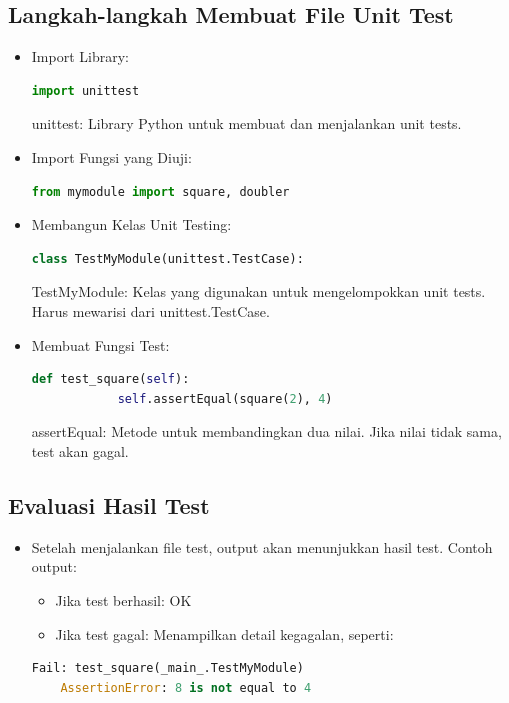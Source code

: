 \documentclass{article}
\begin{document}
\subsection{Langkah-langkah Membuat File Unit Test}
\begin{itemize}
    \item Import Library:
          \begin{lstlisting}[language=Python, caption={}, captionpos=b]
            import unittest
        \end{lstlisting}
          unittest: Library Python untuk membuat dan menjalankan unit tests.
    \item Import Fungsi yang Diuji:
          \begin{lstlisting}[language=Python, caption={}, captionpos=b]
            from mymodule import square, doubler
        \end{lstlisting}
    \item Membangun Kelas Unit Testing:
          \begin{lstlisting}[language=Python, caption={}, captionpos=b]
            class TestMyModule(unittest.TestCase):
        \end{lstlisting}
          TestMyModule: Kelas yang digunakan untuk mengelompokkan unit tests. Harus mewarisi dari unittest.TestCase.
    \item Membuat Fungsi Test:
          \begin{lstlisting}[language=Python, caption={}, captionpos=b]
            def test_square(self):
            self.assertEqual(square(2), 4)
\end{lstlisting}
          assertEqual: Metode untuk membandingkan dua nilai. Jika nilai tidak sama, test akan gagal.
\end{itemize}

\subsection{Evaluasi Hasil Test}
\begin{itemize}
    \item Setelah menjalankan file test, output akan menunjukkan hasil test. Contoh output:
          \begin{itemize}
              \item Jika test berhasil: OK
              \item Jika test gagal: Menampilkan detail kegagalan, seperti:
          \end{itemize}
          \begin{lstlisting}[language=Python, caption={}, captionpos=b]
    Fail: test_square(_main_.TestMyModule)
    AssertionError: 8 is not equal to 4
\end{lstlisting}
\end{itemize}
\end{document}
